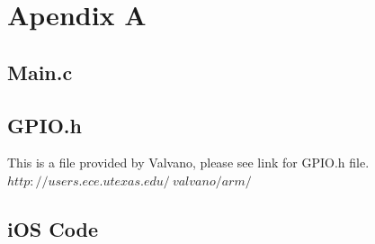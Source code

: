 \documentclass[12pt]{article}
\begin{document}
\newpage
\section{Apendix A}
\subsection{Main.c}


\subsection{GPIO.h}
This is a file provided by Valvano, please see link for GPIO.h file.\\
$http://users.ece.utexas.edu/~valvano/arm/$\\


\subsection{iOS Code}

\end{document}
